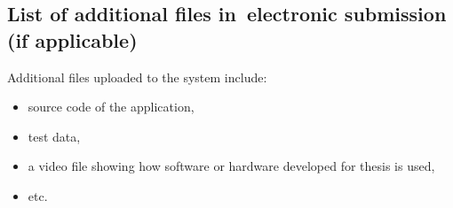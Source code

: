\documentclass[a4paper,twoside,12pt]{book}
\begin{document}
\begin{appendices}
\chapter*{List of additional files in~electronic submission (if applicable)}


Additional files uploaded to the system include:
\begin{itemize}
\item source code of the application,
\item test data,
\item a video file showing how software or hardware developed for thesis is used,
\item etc.
\end{itemize}
 
\listoffigures
{}
\listoftables
{}
	

\end{appendices}
\end{document}
